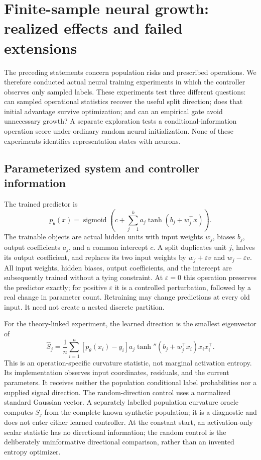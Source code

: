 \section{Finite-sample neural growth: realized effects and failed extensions}
\label{sec:experiments}

The preceding statements concern population risks and prescribed operations.
We therefore conducted actual neural training experiments in which the controller
observes only sampled labels. These experiments test three different questions:
can sampled operational statistics recover the useful split direction; does that
initial advantage survive optimization; and can an empirical gate avoid
unnecessary growth? A separate exploration tests a conditional-information
operation score under ordinary random neural initialization. None of these
experiments identifies representation states with neurons.

\subsection{Parameterized system and controller information}

The trained predictor is
\[
 p_\theta(x)=\operatorname{sigmoid}\left(c+\sum_{j=1}^k
 a_j\tanh(b_j+w_j^\top x)\right).
\]
The trainable objects are actual hidden units with input weights $w_j$, biases
$b_j$, output coefficients $a_j$, and a common intercept $c$. A split duplicates
unit $j$, halves its output coefficient, and replaces its two input weights by
$w_j+\varepsilon v$ and $w_j-\varepsilon v$. All input weights, hidden biases,
output coefficients, and the intercept are subsequently trained without a tying
constraint. At $\varepsilon=0$ this operation preserves the predictor exactly;
for positive $\varepsilon$ it is a controlled perturbation, followed by a real
change in parameter count. Retraining may change predictions at every old input.
It need not create a nested discrete partition.

For the theory-linked experiment, the learned direction is the smallest
eigenvector of
\[
 \widehat S_j=\frac1n\sum_{i=1}^n
 [p_\theta(x_i)-y_i]a_j\tanh''(b_j+w_j^\top x_i)x_ix_i^\top.
\]
This is an operation-specific curvature statistic, not marginal activation
entropy. Its implementation observes input coordinates, residuals, and the
current parameters. It receives neither the population conditional label
probabilities nor a supplied signal direction. The random-direction control
uses a normalized standard Gaussian vector. A separately labelled population
curvature oracle computes $S_j$ from the complete known synthetic population;
it is a diagnostic and does not enter either learned controller. At the
constant start, an activation-only scalar statistic has no directional
information; the random control is the deliberately uninformative directional
comparison, rather than an invented entropy optimizer.

